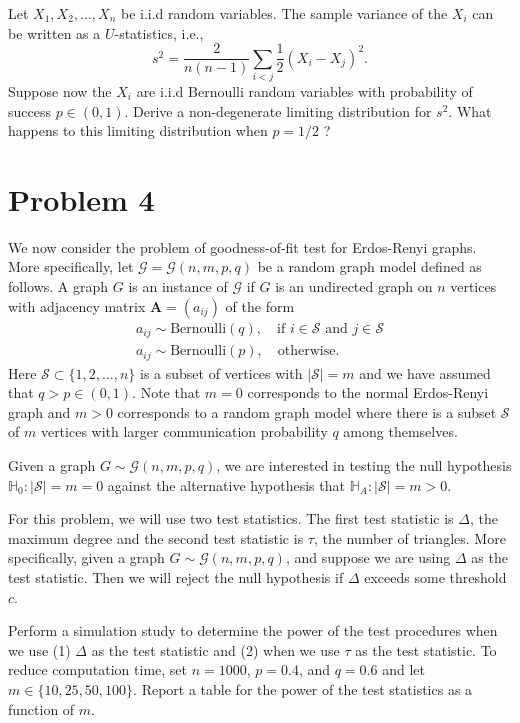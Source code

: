 \documentclass[
]{article}
\begin{document}
Let \(X_1, X_2, \dots, X_n\) be i.i.d random variables. The sample
variance of the \(X_i\) can be written as a \(U\)-statistics, i.e.,
\[s^2 = \frac{2}{n(n-1)} \sum_{i < j} \frac{1}{2} (X_i - X_j)^2.\]
Suppose now the \(X_i\) are i.i.d Bernoulli random variables with
probability of success \(p \in (0,1)\). Derive a non-degenerate limiting
distribution for \(s^2\). What happens to this limiting distribution
when \(p = 1/2\) ?

\hypertarget{problem-4}{%
\section{Problem 4}\label{problem-4}}

We now consider the problem of goodness-of-fit test for Erdos-Renyi
graphs. More specifically, let \(\mathcal{G} = \mathcal{G}(n,m,p, q)\)
be a random graph model defined as follows. A graph \(G\) is an instance
of \(\mathcal{G}\) if \(G\) is an undirected graph on \(n\) vertices
with adjacency matrix \(\mathbf{A} = (a_{ij})\) of the form
\begin{gather*}
a_{ij} \sim \mathrm{Bernoulli}(q), \quad \text{if $i \in \mathcal{S}$ and $j \in \mathcal{S}$} \\
a_{ij} \sim \mathrm{Bernoulli}(p), \quad \text{otherwise}.
\end{gather*} Here \(\mathcal{S} \subset \{1,2,\dots,n\}\) is a subset
of vertices with \(|\mathcal{S}| = m\) and we have assumed that
\(q > p \in (0,1)\). Note that \(m = 0\) corresponds to the normal
Erdos-Renyi graph and \(m > 0\) corresponds to a random graph model
where there is a subset \(\mathcal{S}\) of \(m\) vertices with larger
communication probability \(q\) among themselves.

Given a graph \(G \sim \mathcal{G}(n,m,p,q)\), we are interested in
testing the null hypothesis
\(\mathbb{H}_0 \colon |\mathcal{S}| = m = 0\) against the alternative
hypothesis that \(\mathbb{H}_A \colon |\mathcal{S}| = m > 0\).

For this problem, we will use two test statistics. The first test
statistic is \(\Delta\), the maximum degree and the second test
statistic is \(\tau\), the number of triangles. More specifically, given
a graph \(G \sim \mathcal{G}(n,m,p,q)\), and suppose we are using
\(\Delta\) as the test statistic. Then we will reject the null
hypothesis if \(\Delta\) exceeds some threshold \(c\).

Perform a simulation study to determine the power of the test procedures
when we use (1) \(\Delta\) as the test statistic and (2) when we use
\(\tau\) as the test statistic. To reduce computation time, set
\(n = 1000\), \(p = 0.4\), and \(q = 0.6\) and let
\(m \in \{10,25,50,100\}\). Report a table for the power of the test
statistics as a function of \(m\).
\end{document}
